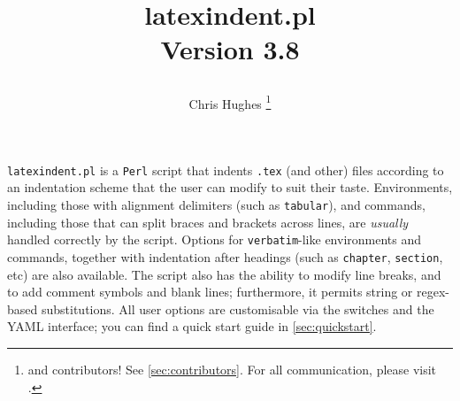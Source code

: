 \title{%
	\begin{tcolorbox}[
			width=5.2cm,
			boxrule=0pt,
			colframe=white!40!black,
			colback=white,
			rightrule=2pt,
			sharp corners,
			enhanced,
			overlay={\node[anchor=north east,outer sep=2pt] at ([xshift=3cm,yshift=4mm]frame.north east) {\texttt{[image: logo]}}; }]
		\centering\ttfamily\bfseries latexindent.pl\\[1cm] Version 3.8
	\end{tcolorbox}
}
\author{Chris Hughes \thanks{and contributors!
		See \vref{sec:contributors}.
		For
		all communication, please visit \cite{latexindent-home}.}}
\maketitle
\begin{adjustwidth}{1cm}{1cm}
	\small
	\texttt{latexindent.pl} is a \texttt{Perl} script that indents \texttt{.tex} (and other) files according to an indentation scheme that the user can modify to suit their taste.
	Environments, including those with alignment delimiters (such as \texttt{tabular}), and commands, including those that can split braces and brackets across lines, are \emph{usually} handled correctly by the script.
	Options for \texttt{verbatim}-like environments and commands, together with indentation after headings (such as \lstinline!chapter!, \lstinline!section!, etc) are also available.
	The script also has the ability to modify line breaks, and to add comment symbols and blank lines; furthermore, it permits string or
	regex-based substitutions.
	All user options are customisable via the switches and the YAML interface; you can find a quick start guide in \vref{sec:quickstart}.
\end{adjustwidth}
